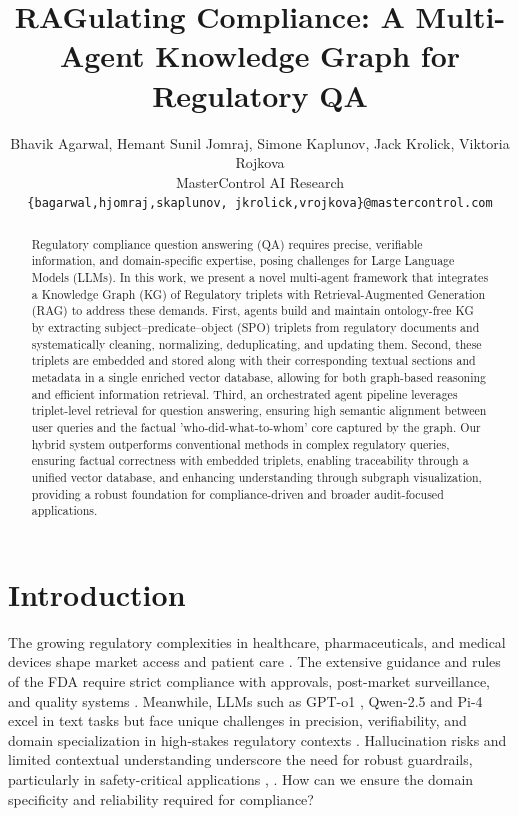 \documentclass{article}
\title{RAGulating Compliance: A Multi-Agent Knowledge Graph for Regulatory QA}
\author{
  Bhavik Agarwal, Hemant Sunil Jomraj, Simone Kaplunov, Jack Krolick, Viktoria Rojkova \\
  MasterControl AI Research \\
  \texttt{\{bagarwal,hjomraj,skaplunov, jkrolick,vrojkova\}@mastercontrol.com}
}
\date{}
\begin{document}
\maketitle


\maketitle

\begin{abstract}
Regulatory compliance question answering (QA) requires precise, verifiable information, and domain-specific expertise, posing challenges for Large Language Models (LLMs). In this work, we present a novel multi-agent framework that integrates a Knowledge Graph (KG) of Regulatory triplets with Retrieval-Augmented Generation (RAG) to address these demands. First, agents build and maintain ontology-free KG by extracting subject–predicate–object (SPO) triplets from regulatory documents and systematically cleaning, normalizing, deduplicating, and updating them. Second, these triplets are embedded and stored along with their corresponding textual sections and metadata in a single enriched vector database, allowing for both graph-based reasoning and efficient information retrieval. Third, an orchestrated agent pipeline leverages triplet-level retrieval for question answering, ensuring high semantic alignment between user queries and the factual 'who-did-what-to-whom' core captured by the graph. Our hybrid system outperforms conventional methods in complex regulatory queries, ensuring factual correctness with embedded triplets, enabling traceability through a unified vector database, and enhancing understanding through subgraph visualization, providing a robust foundation for compliance-driven and broader audit-focused applications. 
\end{abstract}

\section{Introduction}

The growing regulatory complexities in healthcare, pharmaceuticals, and medical devices shape market access and patient care \cite{YuHan2024}. The extensive guidance and rules of the FDA \cite{FDA2025} require strict compliance with approvals, post-market surveillance, and quality systems \cite{Cordes2022}. Meanwhile, LLMs such as GPT-o1 \cite{Zhong2024}, Qwen-2.5 \cite{Yang2024} and Pi-4 \cite{Abdin2024} excel in text tasks but face unique challenges in precision, verifiability, and domain specialization in high-stakes regulatory contexts \cite{Wang2024}. Hallucination risks and limited contextual understanding underscore the need for robust guardrails, particularly in safety-critical applications \cite{Hakim2024}, \cite{Ling2024}. How can we ensure the domain specificity and reliability required for compliance?
\end{document}
